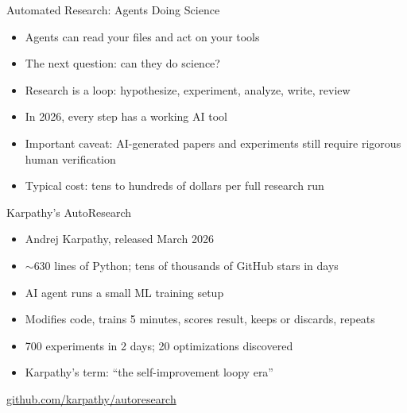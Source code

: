 \documentclass[aspectratio=169]{beamer}
\begin{document}

\begin{frame}{Automated Research: Agents Doing Science}
    \begin{itemize}
        \item Agents can read your files and act on your tools
        \vspace{0.3em}
        \item The next question: can they do science?
        \vspace{0.3em}
        \item Research is a loop: hypothesize, experiment, analyze, write, review
        \vspace{0.3em}
        \item In 2026, every step has a working AI tool
        \vspace{0.3em}
        \item Important caveat: AI-generated papers and experiments still require rigorous human verification
        \vspace{0.3em}
        \item Typical cost: tens to hundreds of dollars per full research run
    \end{itemize}
\end{frame}

\begin{frame}{Karpathy's AutoResearch}
    \begin{itemize}
        \item Andrej Karpathy, released March 2026
        \vspace{0.3em}
        \item $\sim$630 lines of Python; tens of thousands of GitHub stars in days
        \vspace{0.3em}
        \item AI agent runs a small ML training setup
        \vspace{0.3em}
        \item Modifies code, trains 5 minutes, scores result, keeps or discards, repeats
        \vspace{0.3em}
        \item 700 experiments in 2 days; 20 optimizations discovered
        \vspace{0.3em}
        \item Karpathy's term: ``the self-improvement loopy era''
    \end{itemize}
    \vspace{0.4em}
    \footnotesize \url{github.com/karpathy/autoresearch}
\end{frame}
\end{document}
